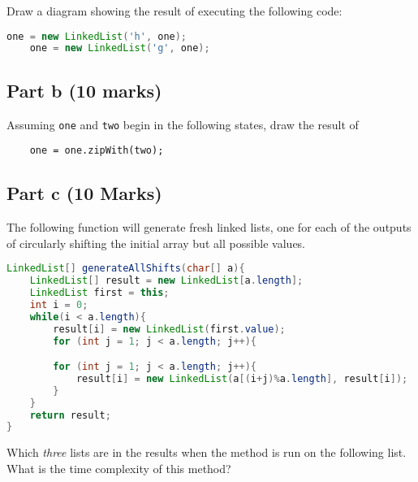 \documentclass[twoside=false,DIV=14]{scrartcl}
\begin{document}
Draw a diagram showing the result of executing the following code:
\begin{lstlisting}[language=java]
    one = new LinkedList('h', one);
    one = new LinkedList('g', one);
\end{lstlisting}

\subsection*{Part b (10 marks)}
Assuming \lstinline{one} and \lstinline{two} begin in the following states, draw the result of 
\begin{lstlisting}
    one = one.zipWith(two);
\end{lstlisting}

\vspace{2em}

\vspace{2em}
\subsection*{Part c (10 Marks)}
The following function will generate fresh linked lists, one for each of the outputs of circularly shifting the initial array but all possible values.
\begin{lstlisting}[language=java]
LinkedList[] generateAllShifts(char[] a){
    LinkedList[] result = new LinkedList[a.length];
    LinkedList first = this;
    int i = 0;
    while(i < a.length){
        result[i] = new LinkedList(first.value);
        for (int j = 1; j < a.length; j++){

        for (int j = 1; j < a.length; j++){
            result[i] = new LinkedList(a[(i+j)%a.length], result[i]);
        }
    }
    return result;
}
\end{lstlisting}
Which \emph{three} lists are in the results when the method is run on the following list.  What is the time complexity of this method?
\end{document}
